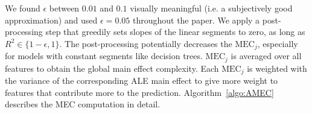 \documentclass[runningheads]{llncs}\usepackage[]{graphicx}\usepackage[]{color}
\begin{document}
We found $\epsilon$ between $0.01$ and $0.1$ visually meaningful (i.e. a subjectively good approximation) and used $\epsilon=0.05$ throughout the paper.
We apply a post-processing step that greedily sets slopes of the linear segments to zero, as long as $R^2\in\{1-\epsilon,1\}$.
The post-processing potentially decreases the $\text{MEC}_j$, especially for models with constant segments like decision trees.
$\text{MEC}_j$ is averaged over all features to obtain the global main effect complexity.
Each $\text{MEC}_j$ is weighted with the variance of the corresponding ALE main effect to give more weight to features that contribute more to the prediction.
Algorithm~\ref{algo:AMEC} describes the MEC computation in detail.
\end{document}
